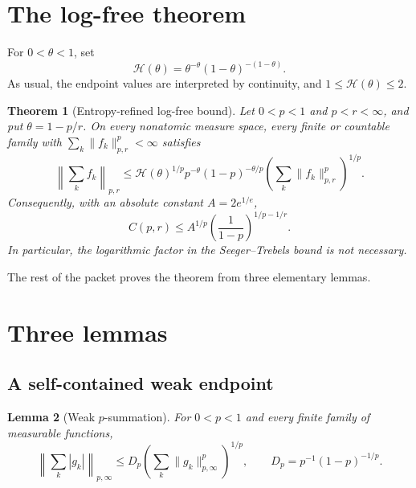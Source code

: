 \documentclass[11pt]{article}
\newtheorem{theorem}{Theorem}
\newtheorem{lemma}[theorem]{Lemma}
\newcommand{\1}{\mathbf 1}
\begin{document}
\section{The log-free theorem}

For $0<\theta<1$, set
\begin{equation}\label{eq:entropy}
 \mathcal H(\theta)
 =\theta^{-\theta}(1-\theta)^{-(1-\theta)}.
\end{equation}
As usual, the endpoint values are interpreted by continuity, and
$1\le\mathcal H(\theta)\le2$.

\begin{theorem}[Entropy-refined log-free bound]\label{thm:main}
Let $0<p<1$ and $p<r<\infty$, and put $\theta=1-p/r$.  On every nonatomic
measure space, every finite or countable family with
$\sum_k\|f_k\|_{p,r}^p<\infty$ satisfies
\begin{equation}\label{eq:mainsharp}
 \left\|\sum_k f_k\right\|_{p,r}
 \le
 \mathcal H(\theta)^{1/p}
 p^{-\theta}(1-p)^{-\theta/p}
 \left(\sum_k\|f_k\|_{p,r}^p\right)^{1/p}.
\end{equation}
Consequently, with an absolute constant $A=2e^{1/e}$,
\begin{equation}\label{eq:clean}
 C(p,r)\le A^{1/p}
 \left(\frac1{1-p}\right)^{1/p-1/r}.
\end{equation}
In particular, the logarithmic factor in the Seeger--Trebels bound is not
necessary.
\end{theorem}

The rest of the packet proves the theorem from three elementary lemmas.

\section{Three lemmas}

\subsection{A self-contained weak endpoint}

\begin{lemma}[Weak $p$-summation]\label{lem:weak}
For $0<p<1$ and every finite family of measurable functions,
\begin{equation}\label{eq:weak}
 \left\|\sum_k |g_k|\right\|_{p,\infty}
 \le D_p\left(\sum_k\|g_k\|_{p,\infty}^p\right)^{1/p},
 \qquad
 D_p=p^{-1}(1-p)^{-1/p}.
\end{equation}
\end{lemma}
\end{document}
